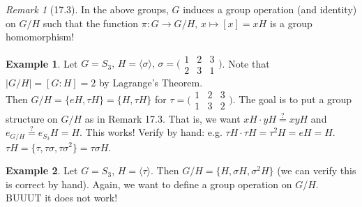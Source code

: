 \documentclass{article}
\newcommand{\func}[3]{#1: #2 \to #3}
\theoremstyle{definition}
\newtheorem*{ex}{Example}
\theoremstyle{remark}
\newtheorem*{rmk}{Remark}
\newcommand{\cyc}[1]{\langle#1\rangle}
\begin{document}
{{            \begin{rmk}[17.3]
                In the above groups, $G$ induces a group operation (and identity) on $G/H$ such that the function $\func{\pi}{G}{G/H}, \, x\mapsto [x]=xH$ is a group homomorphism!
            \end{rmk}
            
            \begin{ex}
                Let $G=S_3, \, H=\cyc{\sigma}, \, \sigma= \big(\begin{smallmatrix} 1&2&3\\ 2&3&1 \end{smallmatrix}\big)$. Note that $|G/H|=[G:H]=2$ by Lagrange's Theorem.\\
                Then $G/H=\{eH,\tau H\}=\{H,\tau H\}$ for $\tau=\big(\begin{smallmatrix} 1&2&3\\ 1&3&2 \end{smallmatrix}\big)$. The goal is to put a group structure on $G/H$ as in Remark 17.3. That is, we want $xH\cdot yH \overset{?}{=} xyH$ and $e_{G/H}\overset{?}{=} e_{S_3}H=H$. This works! Verify by hand: e.g. $\tau H\cdot \tau H=\tau^2 H=eH=H$. $\tau H=\{\tau, \tau\sigma, \tau\sigma^2\}=\tau\sigma H$.
            \end{ex}
            
            \begin{ex}
                Let $G=S_3$, $H=\cyc{\tau}$. Then $G/H=\{H, \sigma H, \sigma^2 H\}$ (we can verify this is correct by hand). Again, we want to define a group operation on $G/H$. BUUUT it does not work!
            \end{ex}
        }
    }
    
\end{document}

